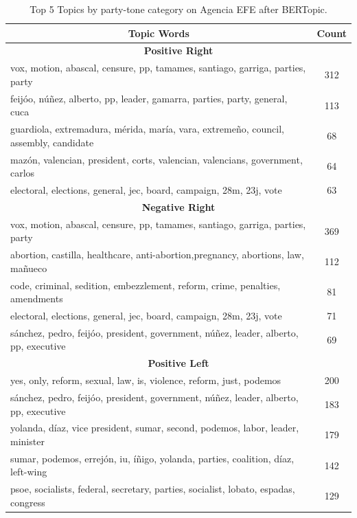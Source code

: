 \documentclass[12pt]{article}
\begin{document}
	
\begin{table}[h!]
	\centering
	\caption{Top 5 Topics by party-tone category on Agencia EFE after BERTopic. }
	\begin{tabular}{|l|c|}
		\hline
				\multicolumn{1}{|c|}{\textbf{Topic Words}}& \textbf{Count} \\
		\hline
		\hline
		\multicolumn{2}{|c|}{\textbf{Positive Right}} \\
		\hline
		vox, motion, abascal, censure, pp, tamames, santiago, garriga, parties, party & 312 \\
		feijóo, núñez, alberto, pp, leader, gamarra, parties, party, general, cuca & 113 \\
		guardiola, extremadura, mérida, maría, vara, extremeño, council, assembly, candidate & 68 \\
		mazón, valencian, president, corts, valencian, valencians, government, carlos & 64 \\
		electoral, elections, general, jec, board, campaign, 28m, 23j, vote & 63 \\
		\hline
		\multicolumn{2}{|c|}{\textbf{Negative Right}} \\
		\hline
		vox, motion, abascal, censure, pp, tamames, santiago, garriga, parties, party & 369 \\
		abortion, castilla, healthcare, anti-abortion,pregnancy, abortions, law, mañueco & 112 \\
		code, criminal, sedition, embezzlement, reform, crime, penalties, amendments & 81 \\
		electoral, elections, general, jec, board, campaign, 28m, 23j, vote & 71 \\
		sánchez, pedro, feijóo, president, government, núñez, leader, alberto, pp, executive & 69 \\
		\hline
		\multicolumn{2}{|c|}{\textbf{Positive Left}} \\
		\hline
		yes, only, reform, sexual, law, is, violence, reform, just, podemos & 200 \\
		sánchez, pedro, feijóo, president, government, núñez, leader, alberto, pp, executive & 183 \\
		yolanda, díaz, vice president, sumar, second, podemos, labor, leader, minister & 179 \\
		sumar, podemos, errejón, iu, íñigo, yolanda, parties, coalition, díaz, left-wing & 142 \\
		psoe, socialists, federal, secretary, parties, socialist, lobato, espadas, congress & 129 \\
		\hline

\end{tabular}
\end{table}
\end{document}
